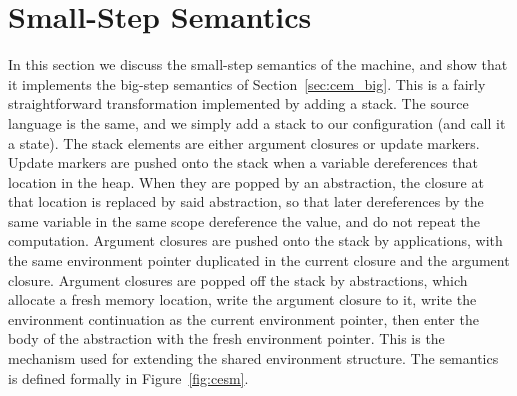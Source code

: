 \section{\ce Small-Step Semantics} \label{sec:cem_small}

In this section we discuss the small-step semantics of the \ce 
machine, and show that it implements the big-step semantics of
Section~\ref{sec:cem_big}. This is a fairly straightforward transformation implemented
by adding a stack. The source language is the same, and we simply add a stack to
our configuration (and call it a state). The stack elements are either argument
closures or update markers. Update markers are pushed onto the stack when a
variable dereferences that location in the heap. When they are popped by an
abstraction, the closure at that location is replaced by said abstraction, so
that later dereferences by the same variable in the same scope dereference the
value, and do not repeat the computation.  Argument closures are pushed onto the
stack by applications, with the same environment pointer duplicated in the
current closure and the argument closure.  Argument closures are popped off the
stack by abstractions, which allocate a fresh memory location, write the
argument closure to it, write the environment continuation as the current
environment pointer, then enter the body of the abstraction with the fresh
environment pointer. This is the mechanism used for extending the shared
environment structure. The semantics is defined formally in
Figure~\ref{fig:cesm}.  

